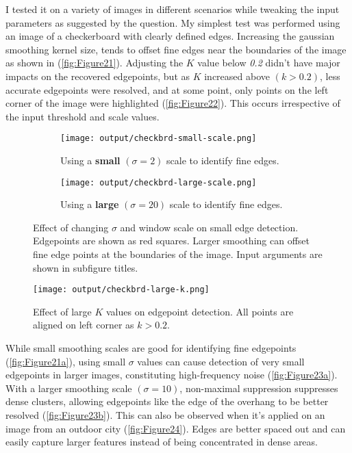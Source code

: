 \documentclass[12pt]{report}
\begin{document}
\begin{enumerate}
    I tested it on a variety of images in different scenarios while tweaking the input parameters as suggested by the question. My simplest test was performed 
    using an image of a checkerboard with clearly defined edges. Increasing the gaussian smoothing kernel size, tends to offset fine edges near the boundaries of the image 
    as shown in (\autoref{fig:Figure21}). Adjusting the $K$ value below \emph{0.2} didn't have major impacts on the recovered edgepoints, but as $K$ increased above $(k>0.2)$, 
    less accurate edgepoints were resolved, and at some point, only points on the left corner of the image were highlighted (\autoref{fig:Figure22}). This occurs irrespective 
    of the input threshold and scale values.

    \begin{figure}[!ht]\centering
        \hspace*{-0.8in}
        \begin{subfigure}{0.40\textwidth}
            \texttt{[image: output/checkbrd-small-scale.png]}
            \caption{Using a \textbf{small} $(\sigma=2)$ scale to identify fine edges.}
            \label{fig:Figure21a}
        \end{subfigure}
    \hfil
        \begin{subfigure}{0.40\textwidth}
        \texttt{[image: output/checkbrd-large-scale.png]}
        \caption{Using a \textbf{large} $(\sigma=20)$ scale to identify fine edges.}
        \label{fig:Figure21b}
        \end{subfigure}
        \caption{Effect of changing $\sigma$ and window scale on small edge detection. Edgepoints are shown as red squares. Larger smoothing can offset fine edge points at 
        the boundaries of the image. Input arguments are shown in subfigure titles.}
        \label{fig:Figure21}
    \end{figure}

    \begin{figure}[H]
        \centering
        \texttt{[image: output/checkbrd-large-k.png]}
        \caption{Effect of large $K$ values on edgepoint detection. All points are aligned on left corner as $k>0.2$.}
        \label{fig:Figure22}
    \end{figure}

    While small smoothing scales are good for identifying fine edgepoints (\autoref{fig:Figure21a}), using small $\sigma$ values can cause detection of very small edgepoints 
    in larger images, constituting high-frequency noise (\autoref{fig:Figure23a}). With a larger smoothing scale $(\sigma=10)$, non-maximal suppression suppresses dense 
    clusters, allowing edgepoints like the edge of the overhang to be better resolved (\autoref{fig:Figure23b}). This can also be observed when it's applied on an image 
    from an outdoor city (\autoref{fig:Figure24}). Edges are better spaced out and can easily capture larger features instead of being concentrated in dense areas.


\end{enumerate}
\end{document}
